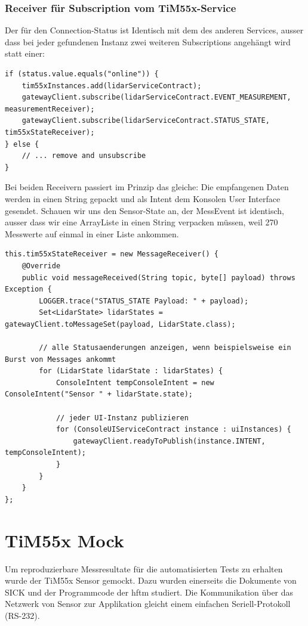 \subsubsection{Receiver für Subscription vom TiM55x-Service}
Der  für den Connection-Status ist Identisch mit dem des anderen Services, ausser dass bei jeder gefundenen Instanz zwei weiteren Subscriptions angehängt wird statt einer:
\begin{lstlisting}
if (status.value.equals("online")) {
    tim55xInstances.add(lidarServiceContract);
    gatewayClient.subscribe(lidarServiceContract.EVENT_MEASUREMENT, measurementReceiver);
    gatewayClient.subscribe(lidarServiceContract.STATUS_STATE, tim55xStateReceiver);
} else {
    // ... remove and unsubscribe
}
\end{lstlisting}
Bei beiden Receivern passiert im Prinzip das gleiche: Die empfangenen Daten werden in einen String gepackt und als Intent dem Konsolen User Interface gesendet. Schauen wir uns den Sensor-State an, der MessEvent ist identisch, ausser dass wir eine ArrayListe in einen String verpacken müssen, weil 270 Messwerte auf einmal in einer Liste ankommen.
\begin{lstlisting}
this.tim55xStateReceiver = new MessageReceiver() {
    @Override
    public void messageReceived(String topic, byte[] payload) throws Exception {
        LOGGER.trace("STATUS_STATE Payload: " + payload);
        Set<LidarState> lidarStates = gatewayClient.toMessageSet(payload, LidarState.class);

        // alle Statusaenderungen anzeigen, wenn beispielsweise ein Burst von Messages ankommt
        for (LidarState lidarState : lidarStates) {
            ConsoleIntent tempConsoleIntent = new ConsoleIntent("Sensor " + lidarState.state);

            // jeder UI-Instanz publizieren
            for (ConsoleUIServiceContract instance : uiInstances) {
                gatewayClient.readyToPublish(instance.INTENT, tempConsoleIntent);
            }
        }
    }
};
\end{lstlisting}

\section{TiM55x Mock}
\label{chap:tim-mock}
Um reproduzierbare Messresultate für die automatisierten Tests zu erhalten wurde der TiM55x Sensor gemockt. Dazu wurden einerseits die Dokumente von SICK und der Programmcode der \acrshort{hftm} studiert. Die Kommunikation über das Netzwerk von Sensor zur Applikation gleicht einem einfachen Seriell-Protokoll (RS-232).

